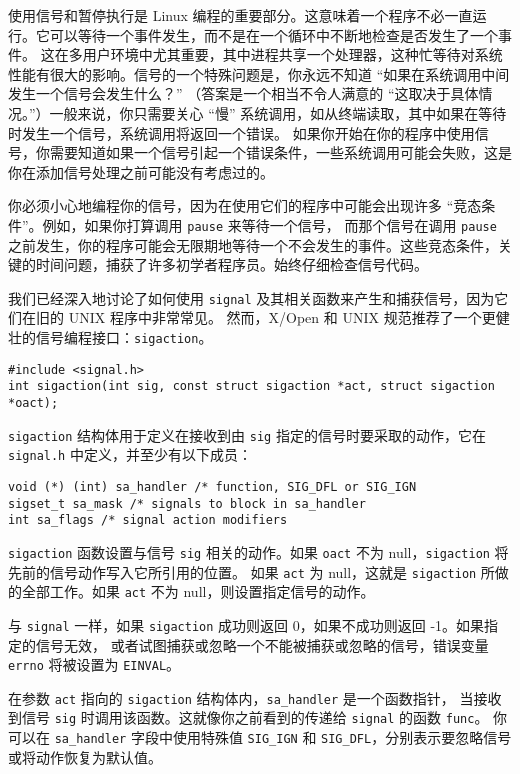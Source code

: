 \documentclass{ctexart}
\begin{document}
使用信号和暂停执行是 Linux 编程的重要部分。这意味着一个程序不必一直运行。它可以等待一个事件发生，而不是在一个循环中不断地检查是否发生了一个事件。
这在多用户环境中尤其重要，其中进程共享一个处理器，这种忙等待对系统性能有很大的影响。信号的一个特殊问题是，你永远不知道 ``如果在系统调用中间发生一个信号会发生什么？''
（答案是一个相当不令人满意的 ``这取决于具体情况。''）一般来说，你只需要关心 ``慢'' 系统调用，如从终端读取，其中如果在等待时发生一个信号，系统调用将返回一个错误。
如果你开始在你的程序中使用信号，你需要知道如果一个信号引起一个错误条件，一些系统调用可能会失败，这是你在添加信号处理之前可能没有考虑过的。  
  
你必须小心地编程你的信号，因为在使用它们的程序中可能会出现许多 ``竞态条件''。例如，如果你打算调用 \texttt{pause} 来等待一个信号，
而那个信号在调用 \texttt{pause} 之前发生，你的程序可能会无限期地等待一个不会发生的事件。这些竞态条件，关键的时间问题，捕获了许多初学者程序员。始终仔细检查信号代码。  
  
我们已经深入地讨论了如何使用 \texttt{signal} 及其相关函数来产生和捕获信号，因为它们在旧的 UNIX 程序中非常常见。
然而，X/Open 和 UNIX 规范推荐了一个更健壮的信号编程接口：\texttt{sigaction}。  
  
\begin{verbatim}  
#include <signal.h>  
int sigaction(int sig, const struct sigaction *act, struct sigaction *oact);  
\end{verbatim}  
  
\texttt{sigaction} 结构体用于定义在接收到由 \texttt{sig} 指定的信号时要采取的动作，它在 \texttt{signal.h} 中定义，并至少有以下成员：  
  
\begin{verbatim}  
void (*) (int) sa_handler /* function, SIG_DFL or SIG_IGN  
sigset_t sa_mask /* signals to block in sa_handler  
int sa_flags /* signal action modifiers  
\end{verbatim}  
  
\texttt{sigaction} 函数设置与信号 \texttt{sig} 相关的动作。如果 \texttt{oact} 不为 null，\texttt{sigaction} 将先前的信号动作写入它所引用的位置。
如果 \texttt{act} 为 null，这就是 \texttt{sigaction} 所做的全部工作。如果 \texttt{act} 不为 null，则设置指定信号的动作。  
  
与 \texttt{signal} 一样，如果 \texttt{sigaction} 成功则返回 0，如果不成功则返回 -1。如果指定的信号无效，
或者试图捕获或忽略一个不能被捕获或忽略的信号，错误变量 \texttt{errno} 将被设置为 \texttt{EINVAL}。  
  
在参数 \texttt{act} 指向的 \texttt{sigaction} 结构体内，\texttt{sa\_handler} 是一个函数指针，
当接收到信号 \texttt{sig} 时调用该函数。这就像你之前看到的传递给 \texttt{signal} 的函数 \texttt{func}。
你可以在 \texttt{sa\_handler} 字段中使用特殊值 \texttt{SIG\_IGN} 和 \texttt{SIG\_DFL}，分别表示要忽略信号或将动作恢复为默认值。  
  
\end{document}
